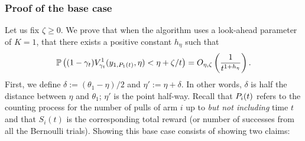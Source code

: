 \begin{myproof}[Proof.]
	\subsubsection*{Proof of the base case}
	Let us fix $\zeta \ge 0$. We prove that when the algorithm uses a look-ahead parameter of $K = 1$, that there exists a positive constant $h_\eta$ such that
	 \begin{equation} \label{eqn:base_case_lemma_underestimation}
	 \mathbb{P} \left( (1-\gamma_t)V^1_{\gamma_t}(y_{1,P_{1}(t)}, \eta) < \eta + \zeta/t \right) = O_{\eta,\zeta}\left(\frac{1}{t^{1 + h_\eta}}\right).
	 \end{equation}
	 First, we define $\delta := (\theta_1 - \eta)/2$ and  $\eta' :=  \eta + \delta$. In other words, $\delta$ is half the distance between $\eta$ and $\theta_1$; $\eta'$ is the point half-way. Recall that $P_{i}(t)$ refers to the counting process for the number of pulls of arm $i$ up to \emph{but not including} time $t$ and that $S_i(t)$ is the corresponding total reward (or number of successes from all the Bernoulli trials). Showing this base case consists of showing two claims:

\end{myproof}
